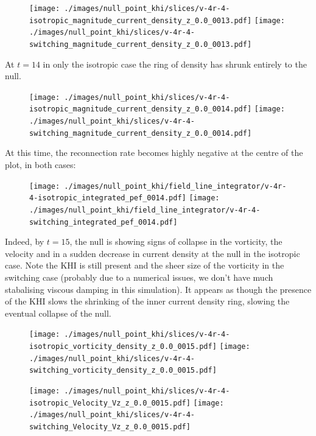 \begin{figure}[H]
  \centering
  \texttt{[image: ./images/null\_point\_khi/slices/v-4r-4-isotropic\_magnitude\_current\_density\_z\_0.0\_0013.pdf]}
  \texttt{[image: ./images/null\_point\_khi/slices/v-4r-4-switching\_magnitude\_current\_density\_z\_0.0\_0013.pdf]}
\end{figure}

At $t=14$ in only the isotropic case the ring of density has shrunk entirely to the null.

\begin{figure}[H]
  \centering
  \texttt{[image: ./images/null\_point\_khi/slices/v-4r-4-isotropic\_magnitude\_current\_density\_z\_0.0\_0014.pdf]}
  \texttt{[image: ./images/null\_point\_khi/slices/v-4r-4-switching\_magnitude\_current\_density\_z\_0.0\_0014.pdf]}
\end{figure}

At this time, the reconnection rate becomes highly negative at the centre of the plot, in both cases:

\begin{figure}[H]
  \centering
  \texttt{[image: ./images/null\_point\_khi/field\_line\_integrator/v-4r-4-isotropic\_integrated\_pef\_0014.pdf]}
  \texttt{[image: ./images/null\_point\_khi/field\_line\_integrator/v-4r-4-switching\_integrated\_pef\_0014.pdf]}
\end{figure}

Indeed, by $t=15$, the null is showing signs of collapse in the vorticity, the velocity and in a sudden decrease in current density at the null in the isotropic case.  Note the KHI is still present and the sheer size of the vorticity in the switching case (probably due to a numerical issues, we don't have much stabalising viscous damping in this simulation). It appears as though the presence of the KHI slows the shrinking of the inner current density ring, slowing the eventual collapse of the null.

\begin{figure}[H]
  \centering
  \texttt{[image: ./images/null\_point\_khi/slices/v-4r-4-isotropic\_vorticity\_density\_z\_0.0\_0015.pdf]}
  \texttt{[image: ./images/null\_point\_khi/slices/v-4r-4-switching\_vorticity\_density\_z\_0.0\_0015.pdf]}
\end{figure}

\begin{figure}[H]
  \centering
  \texttt{[image: ./images/null\_point\_khi/slices/v-4r-4-isotropic\_Velocity\_Vz\_z\_0.0\_0015.pdf]}
  \texttt{[image: ./images/null\_point\_khi/slices/v-4r-4-switching\_Velocity\_Vz\_z\_0.0\_0015.pdf]}
\end{figure}

